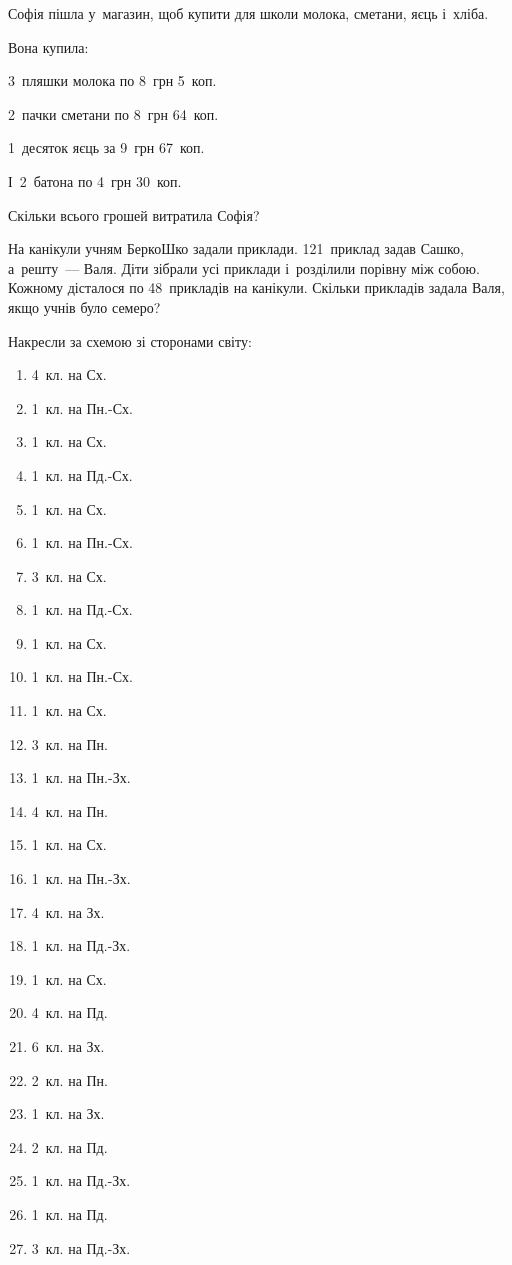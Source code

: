 \problem
Софія пішла у~магазин, щоб купити для школи молока, сметани, яєць і~хліба.

Вона купила:

3~пляшки молока по 8~грн 5~коп.

2~пачки сметани по 8~грн 64~коп.

1~десяток яєць за 9~грн 67~коп.

І~2~батона по 4~грн 30~коп.

Скільки всього грошей витратила Софія?


\problem
На канікули учням БеркоШко задали приклади.
121~приклад задав Сашко, а~решту~--- Валя.
Діти зібрали усі приклади і~розділили порівну між собою.
Кожному дісталося по 48~прикладів на канікули.
Скільки прикладів задала Валя, якщо учнів було семеро?


\problem
Накресли за схемою зі сторонами світу:
\begin{multicols}{2}
    \begin{enumerate}
        \item 4~кл. на Сх.
        \item 1~кл. на Пн.-Сх.
        \item 1~кл. на Сх.
        \item 1~кл. на Пд.-Сх.
        \item 1~кл. на Сх.
        \item 1~кл. на Пн.-Сх.
        \item 3~кл. на Сх.
        \item 1~кл. на Пд.-Сх.
        \item 1~кл. на Сх.
        \item 1~кл. на Пн.-Сх.
        \item 1~кл. на Сх.
        \item 3~кл. на Пн.
        \item 1~кл. на Пн.-Зх.
        \item 4~кл. на Пн.
        \item 1~кл. на Сх.
        \item 1~кл. на Пн.-Зх.
        \item 4~кл. на Зх.
        \item 1~кл. на Пд.-Зх.
        \item 1~кл. на Сх.
        \item 4~кл. на Пд.
        \item 6~кл. на Зх.
        \item 2~кл. на Пн.
        \item 1~кл. на Зх.
        \item 2~кл. на Пд.
        \item 1~кл. на Пд.-Зх.
        \item 1~кл. на Пд.
        \item 3~кл. на Пд.-Зх.
    \end{enumerate}
\end{multicols}


